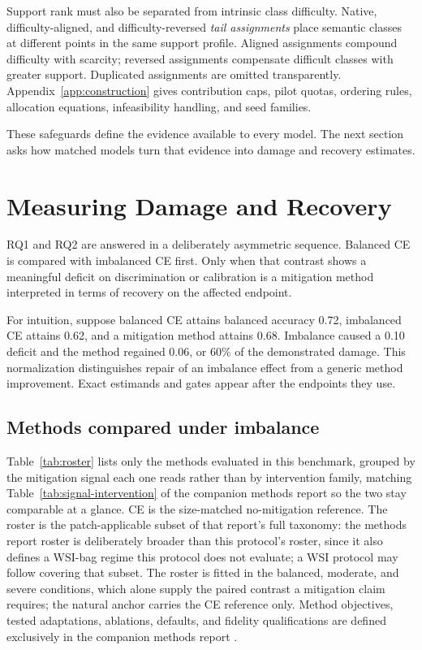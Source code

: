 \documentclass[11pt]{article}
\begin{document}
Support rank must also be separated from intrinsic class difficulty. Native, difficulty-aligned, and difficulty-reversed \emph{tail assignments} place semantic classes at different points in the same support profile. Aligned assignments compound difficulty with scarcity; reversed assignments compensate difficult classes with greater support. Duplicated assignments are omitted transparently. Appendix~\ref{app:construction} gives contribution caps, pilot quotas, ordering rules, allocation equations, infeasibility handling, and seed families.

These safeguards define the evidence available to every model. The next section asks how matched models turn that evidence into damage and recovery estimates.

\section{Measuring Damage and Recovery}
\label{sec:analysis}
RQ1 and RQ2 are answered in a deliberately asymmetric sequence. Balanced CE is compared with imbalanced CE first. Only when that contrast shows a meaningful deficit on discrimination or calibration is a mitigation method interpreted in terms of recovery on the affected endpoint.

For intuition, suppose balanced CE attains balanced accuracy \num{0.72}, imbalanced CE attains \num{0.62}, and a mitigation method attains \num{0.68}. Imbalance caused a \num{0.10} deficit and the method regained \num{0.06}, or 60\% of the demonstrated damage. This normalization distinguishes repair of an imbalance effect from a generic method improvement. Exact estimands and gates appear after the endpoints they use.

\subsection{Methods compared under imbalance}
\label{sec:methods}
Table~\ref{tab:roster} lists only the methods evaluated in this benchmark, grouped by the mitigation signal each one reads rather than by intervention family, matching Table~\ref{tab:signal-intervention} of the companion methods report so the two stay comparable at a glance. CE is the size-matched no-mitigation reference. The roster is the patch-applicable subset of that report's full taxonomy: the methods report roster is deliberately broader than this protocol's roster, since it also defines a WSI-bag regime this protocol does not evaluate; a WSI protocol may follow covering that subset. The roster is fitted in the balanced, moderate, and severe conditions, which alone supply the paired contrast a mitigation claim requires; the natural anchor carries the CE reference only. Method objectives, tested adaptations, ablations, defaults, and fidelity qualifications are defined exclusively in the companion methods report \citep{queisler2026imbalanceMethods}.
\end{document}
